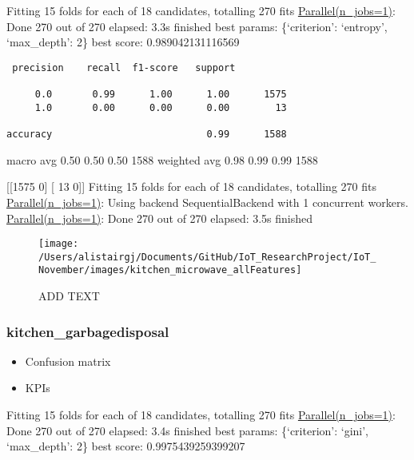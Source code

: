 \documentclass[11pt,]{article}
\providecommand{\tightlist}{%
  \setlength{\itemsep}{0pt}\setlength{\parskip}{0pt}}
\begin{document}
Fitting 15 folds for each of 18 candidates, totalling 270 fits
\href{Done\%20270\%20out\%20of\%20270\%20\%7C\%20elapsed:\%202.1s\%20finished}{Parallel(n\_jobs=1)}:
Done 270 out of 270 \textbar{} elapsed: 3.3s finished best params:
\{`criterion': `entropy', `max\_depth': 2\} best score:
0.989042131116569

\begin{verbatim}
 precision    recall  f1-score   support

     0.0       0.99      1.00      1.00      1575
     1.0       0.00      0.00      0.00        13

accuracy                           0.99      1588
\end{verbatim}

macro avg 0.50 0.50 0.50 1588 weighted avg 0.98 0.99 0.99 1588

{[}{[}1575 0{]} {[} 13 0{]}{]} Fitting 15 folds for each of 18
candidates, totalling 270 fits
\href{Done\%20270\%20out\%20of\%20270\%20\%7C\%20elapsed:\%202.1s\%20finished}{Parallel(n\_jobs=1)}:
Using backend SequentialBackend with 1 concurrent workers.
\href{Done\%20270\%20out\%20of\%20270\%20\%7C\%20elapsed:\%202.1s\%20finished}{Parallel(n\_jobs=1)}:
Done 270 out of 270 \textbar{} elapsed: 3.5s finished

\begin{figure}[H]

{\centering \texttt{[image: /Users/alistairgj/Documents/GitHub/IoT\_ResearchProject/IoT\_November/images/kitchen\_microwave\_allFeatures]} 

}

\caption{ADD TEXT}\label{fig:unnamed-chunk-15}
\end{figure}

\pagebreak

\hypertarget{kitchen_garbagedisposal}{%
\subsubsection{kitchen\_garbagedisposal}\label{kitchen_garbagedisposal}}

\begin{itemize}
\tightlist
\item
  Confusion matrix
\item
  KPIs
\end{itemize}

Fitting 15 folds for each of 18 candidates, totalling 270 fits
\href{Done\%20270\%20out\%20of\%20270\%20\%7C\%20elapsed:\%202.1s\%20finished}{Parallel(n\_jobs=1)}:
Done 270 out of 270 \textbar{} elapsed: 3.4s finished best params:
\{`criterion': `gini', `max\_depth': 2\} best score: 0.9975439259399207
\end{document}
